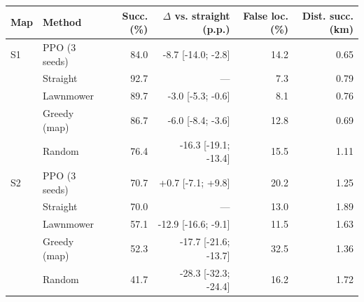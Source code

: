 \begin{tabular}{@{}llrrrr@{}}
\toprule
Map & Method & Succ. (\%) & $\Delta$ vs. straight (p.p.) & False loc. (\%) & Dist. succ. (km) \\
\midrule
S1 & PPO (3 seeds) & 84.0 & -8.7 [-14.0; -2.8] & 14.2 & 0.65 \\
 & Straight & 92.7 & --- & 7.3 & 0.79 \\
 & Lawnmower & 89.7 & -3.0 [-5.3; -0.6] & 8.1 & 0.76 \\
 & Greedy (map) & 86.7 & -6.0 [-8.4; -3.6] & 12.8 & 0.69 \\
 & Random & 76.4 & -16.3 [-19.1; -13.4] & 15.5 & 1.11 \\
\midrule
S2 & PPO (3 seeds) & 70.7 & +0.7 [-7.1; +9.8] & 20.2 & 1.25 \\
 & Straight & 70.0 & --- & 13.0 & 1.89 \\
 & Lawnmower & 57.1 & -12.9 [-16.6; -9.1] & 11.5 & 1.63 \\
 & Greedy (map) & 52.3 & -17.7 [-21.6; -13.7] & 32.5 & 1.36 \\
 & Random & 41.7 & -28.3 [-32.3; -24.4] & 16.2 & 1.72 \\
\bottomrule
\end{tabular}
